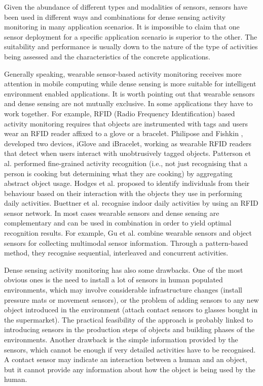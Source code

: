 Given the abundance of different types and modalities of sensors, sensors have been used in different ways and combinations for dense sensing activity monitoring in many application scenarios. It is impossible to claim that one sensor deployment for a specific application scenario is superior to the other. The suitability and performance is usually down to the nature of the type of activities being assessed and the characteristics of the concrete applications. 

Generally speaking, wearable sensor-based activity monitoring receives more attention in mobile computing while dense sensing is more suitable for intelligent environment enabled applications. It is worth pointing out that wearable sensors and dense sensing are not mutually exclusive. In some applications they have to work together. For example, RFID (Radio Frequency Identification) based activity monitoring requires that objects are instrumented with tags and users wear an RFID reader affixed to a glove or a bracelet. Philipose and Fishkin \cite{Philipose2004}, \cite{Fishkin2005} developed two devices, iGlove and iBracelet, working as wearable RFID readers that detect when users interact with unobtrusively tagged objects. Patterson et al. \cite{Patterson2005} performed fine-grained activity recognition (i.e., not just recognising that a person is cooking but determining what they are cooking) by aggregating abstract object usage. Hodges et al. \cite{Hodges2007} proposed to identify individuals from their behaviour based on their interaction with the objects they use in performing daily activities. Buettner et al. \cite{Buettner2009} recognise indoor daily activities by using an RFID sensor network. In most cases wearable sensors and dense sensing are complementary and can be used in combination in order to yield optimal recognition results. For example, Gu et al. \cite{Gu2009} combine wearable sensors and object sensors for collecting multimodal sensor information. Through a pattern-based method, they recognise sequential, interleaved and concurrent activities.

Dense sensing activity monitoring has also some drawbacks. One of the most obvious ones is the need to install a lot of sensors in human populated environments, which may involve considerable infrastructure changes (install pressure mats or movement sensors), or the problem of adding sensors to any new object introduced in the environment (attach contact sensors to glasses bought in the supermarket). The practical feasibility of the approach is probably linked to introducing sensors in the production steps of objects and building phases of the environments. Another drawback is the simple information provided by the sensors, which cannot be enough if very detailed activities have to be recognised. A contact sensor may indicate an interaction between a human and an object, but it cannot provide any information about how the object is being used by the human. 
